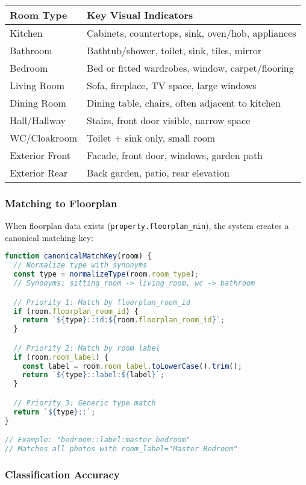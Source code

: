 \documentclass[11pt,a4paper]{article}
\begin{document}
\begin{longtable}{@{}p{3.5cm}p{11cm}@{}}
\toprule
\textbf{Room Type} & \textbf{Key Visual Indicators} \\
\midrule
Kitchen & Cabinets, countertops, sink, oven/hob, appliances \\
Bathroom & Bathtub/shower, toilet, sink, tiles, mirror \\
Bedroom & Bed or fitted wardrobes, window, carpet/flooring \\
Living Room & Sofa, fireplace, TV space, large windows \\
Dining Room & Dining table, chairs, often adjacent to kitchen \\
Hall/Hallway & Stairs, front door visible, narrow space \\
WC/Cloakroom & Toilet + sink only, small room \\
Exterior Front & Facade, front door, windows, garden path \\
Exterior Rear & Back garden, patio, rear elevation \\
\bottomrule
\end{longtable}

\subsubsection{Matching to Floorplan}

When floorplan data exists (\texttt{property.floorplan\_min}), the system creates a canonical matching key:

\begin{lstlisting}[language=JavaScript, caption=Room Matching Algorithm]
function canonicalMatchKey(room) {
  // Normalize type with synonyms
  const type = normalizeType(room.room_type);
  // Synonyms: sitting_room -> living_room, wc -> bathroom

  // Priority 1: Match by floorplan_room_id
  if (room.floorplan_room_id) {
    return `${type}::id:${room.floorplan_room_id}`;
  }

  // Priority 2: Match by room label
  if (room.room_label) {
    const label = room.room_label.toLowerCase().trim();
    return `${type}::label:${label}`;
  }

  // Priority 3: Generic type match
  return `${type}::`;
}

// Example: "bedroom::label:master bedroom"
// Matches all photos with room_label="Master Bedroom"
\end{lstlisting}

\subsubsection{Classification Accuracy}
\end{document}
